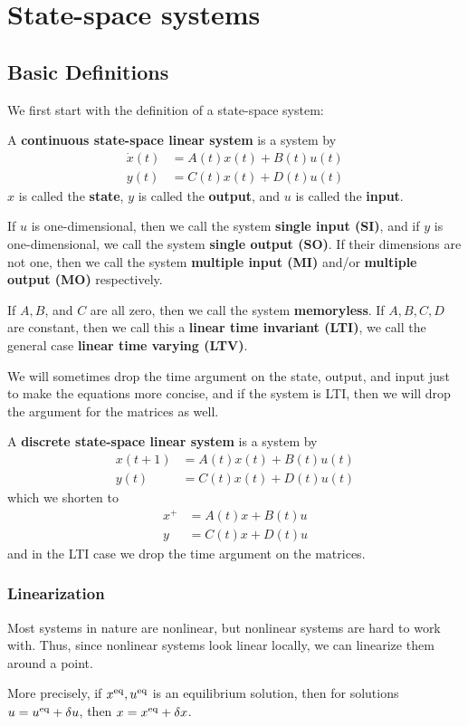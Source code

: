\chapter{State-space systems}
\section{Basic Definitions}

We first start with the definition of a state-space system:

\begin{definition}
    A \textbf{continuous state-space linear system} is a system by 
    \begin{align*}
        \dot x(t) &= A(t)x(t) + B(t)u(t) \\ 
        y(t) &= C(t)x(t) + D(t)u(t)
    \end{align*}
    $x$ is called the \textbf{state}, $y$ is called the \textbf{output}, and $u$ is called the \textbf{input}.

    If $u$ is one-dimensional, then we call the system \textbf{single input (SI)}, and if $y$ is one-dimensional, we call the system \textbf{single output (SO)}. If their dimensions are not one, then we call the system \textbf{multiple input (MI)} and/or \textbf{multiple output (MO)} respectively.

    If $A, B$, and $C$ are all zero, then we call the system \textbf{memoryless}. If $A, B, C, D$ are constant, then we call this a \textbf{linear time invariant (LTI)}, we call the general case \textbf{linear time varying (LTV)}.
\end{definition}

We will sometimes drop the time argument on the state, output, and input just to make the equations more concise, and if the system is LTI, then we will drop the argument for the matrices as well.

\begin{definition}
    A \textbf{discrete state-space linear system} is a system by 
    \begin{align*}
        x(t + 1) &= A(t)x(t) + B(t)u(t) \\ 
        y(t) &= C(t)x(t) + D(t)u(t)
    \end{align*}
    which we shorten to 
    \begin{align*}
        x^+ &= A(t)x + B(t)u \\ 
        y &= C(t)x + D(t)u
    \end{align*}
    and in the LTI case we drop the time argument on the matrices.
\end{definition}

\subsection{Linearization}

Most systems in nature are nonlinear, but nonlinear systems are hard to work with. Thus, since nonlinear systems look linear locally, we can linearize them around a point. 

More precisely, if $x^\mathrm{eq}, u^\mathrm{eq}$ is an equilibrium solution, then for solutions $u = u^\mathrm{eq} + \delta u$, then $x = x^\mathrm{eq} + \delta x$.

